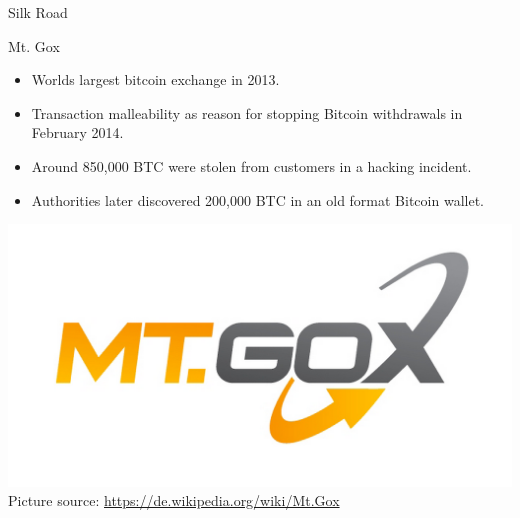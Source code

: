 \documentclass[]{beamer}
\begin{document}
\begin{frame}{Silk Road}
\end{frame}

\begin{frame}{Mt. Gox}
	\centering
	\begin{itemize}
		\item Worlds largest bitcoin exchange in 2013.
		\item Transaction malleability as reason for stopping Bitcoin withdrawals in February 2014.
		\item Around 850,000 BTC were stolen from customers in a hacking incident.
		\item Authorities later discovered 200,000 BTC in an old format Bitcoin wallet.
	\end{itemize}
	\includegraphics[scale=0.1]{../assets/images/mt_gox}\\
	\footnotesize{Picture source: \url{https://de.wikipedia.org/wiki/Mt.Gox}}
\end{frame}
\end{document}
